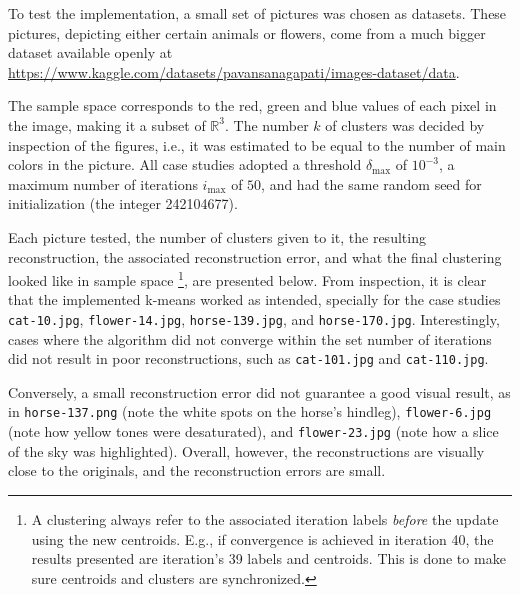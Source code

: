 To test the implementation, a small set of pictures was chosen as datasets.
These pictures, depicting either certain animals or flowers, 
come from a much bigger dataset available openly at 
\url{https://www.kaggle.com/datasets/pavansanagapati/images-dataset/data}.

The sample space corresponds to the red, green and blue values of each pixel in the image,
making it a subset of $\mathbb{R}^3$.
%
The number $k$ of clusters was decided by inspection of the figures, i.e., 
it was estimated to be equal to the number of main colors in the picture.
%
All case studies adopted a threshold $\delta_{\max}$ of $10^{-3}$, 
a maximum number of iterations $i_{\max}$ of $50$,
and had the same random seed for initialization (the integer 242104677).

Each picture tested, 
the number of clusters given to it, 
the resulting reconstruction, 
the associated reconstruction error,
and what the final clustering looked like in sample space%
\footnote{%
    A clustering always refer to the associated iteration labels \textit{before} 
    the update using the new centroids.
    E.g., if convergence is achieved in iteration 40, 
    the results presented are iteration's 39 labels and centroids.
    This is done to make sure centroids and clusters are synchronized.
}, are presented below.
%
From inspection, it is clear that the implemented k-means worked as intended,
specially for the case studies 
\texttt{cat-10.jpg},  
\texttt{flower-14.jpg},
\texttt{horse-139.jpg}, and 
\texttt{horse-170.jpg}.
%
Interestingly, cases where the algorithm did not converge within the set number of iterations
did not result in poor reconstructions, such as \texttt{cat-101.jpg} and \texttt{cat-110.jpg}.

Conversely, a small reconstruction error did not guarantee a good visual result, as in 
\texttt{horse-137.png} (note the white spots on the horse's hindleg),
\texttt{flower-6.jpg} (note how yellow tones were desaturated), and 
\texttt{flower-23.jpg} (note how a slice of the sky was highlighted).
%
Overall, however, the reconstructions are visually close to the originals,
and the reconstruction errors are small.

